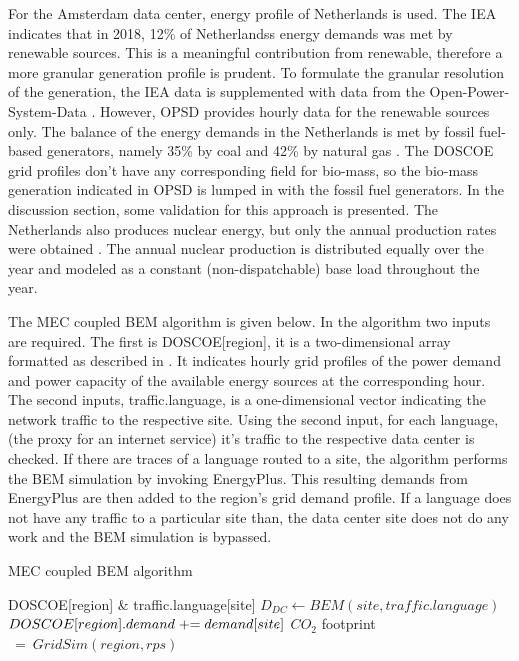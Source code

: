   For the Amsterdam data center, energy profile of Netherlands is used. The IEA indicates that in 2018, 12\% of Netherlands\textsc{}s energy demands was met by renewable sources. This is a meaningful contribution from renewable, therefore a more granular generation profile is prudent.  To formulate the granular resolution of the generation, the IEA data is supplemented with data from the Open-Power-System-Data \cite{ospd19}. However, OPSD provides hourly data for the renewable sources only. The balance of the energy demands in the Netherlands is met by fossil fuel-based generators, namely 35\% by coal and 42\% by natural gas \cite{eia20b}. The DOSCOE grid profiles don’t have any corresponding field for bio-mass, so the bio-mass generation indicated in OPSD is lumped in with the fossil fuel generators. In the discussion section, some validation for this approach is presented. The Netherlands also produces nuclear energy, but only the annual production rates were obtained \cite{eia20b}. The annual nuclear production is distributed equally over the year and modeled as a constant (non-dispatchable) base load throughout the year.  

  The MEC coupled BEM algorithm is given below. In the algorithm two inputs are required. The first is DOSCOE[region], it is a two-dimensional array formatted as described in \cite{platt17}. It indicates hourly grid profiles of the power demand and power capacity of the available energy sources at the corresponding hour. The second inputs, traffic.language, is a one-dimensional vector indicating the network traffic to the respective site. Using the second input, for each language, (the proxy for an internet service) it’s traffic to the respective data center is checked. If there are traces of a language routed to a site, the algorithm performs the BEM simulation by invoking EnergyPlus. This resulting demands from EnergyPlus are then added to the region’s grid demand profile. If a language does not have any traffic to a particular site than, the data center site does not do any work and the BEM simulation is bypassed.  

  \begin{algorithm}
    \begin{small}
    \caption{MEC coupled BEM algorithm}
    \begin{algorithmic}
      \REQUIRE DOSCOE[region] \& traffic.language[site]
        \STATE $D_{DC} \gets BEM(site, traffic.language)$
        \STATE $DOSCOE[region].demand \mathrel{+}= demand[site]$
        \ENDIF
      \ENDFOR
      \STATE $CO_{2}$ {footprint}$\ =\ GridSim(region, rps)$
    \end{algorithmic}
    \label{Service Profile}
  \end{small}
  \end{algorithm}

